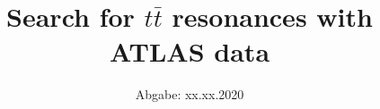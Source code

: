 

\subject{Lehrstuhlversuch im SS2020}
\title{Search for $t\bar{t}$ resonances with ATLAS data}
\date{%
  Abgabe: xx.xx.2020
}



\maketitle
\thispagestyle{empty}
\tableofcontents
\newpage







%


